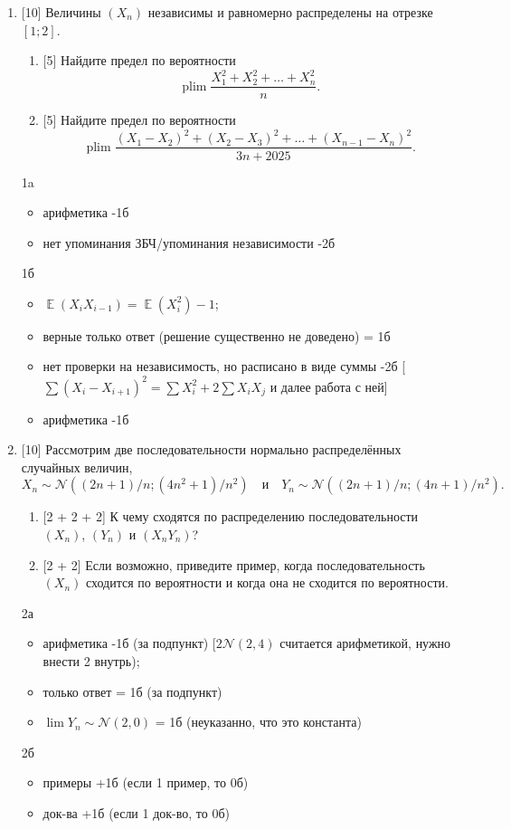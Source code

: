 \documentclass[12pt]{article}
\DeclareMathOperator{\E}{\mathbb{E}}
\DeclareMathOperator{\plim}{plim}
\newcommand{\cN}{\mathcal{N}}
\begin{document}
\begin{enumerate}
\item {[10]} Величины $(X_n)$ независимы и равномерно распределены на отрезке $[1; 2]$.
\begin{enumerate}
\item {[5]} Найдите предел по вероятности
\[
\plim \frac{X_1^2 + X_2^2 + \dots + X_n^2}{n}.
\]
\item {[5]} Найдите предел по вероятности 
\[
    \plim \frac{(X_1 - X_2)^2 + (X_2 - X_3)^2 + \dots + (X_{n-1} - X_n)^2}{3n + 2025}.
\]
\end{enumerate}



1a
\begin{itemize}
    \item арифметика -1б
    \item нет упоминания ЗБЧ/упоминания независимости -2б
\end{itemize}
1б 
\begin{itemize}
    \item $\E(X_i X_{i-1}) = \E(X_i^2) -1$;
    \item верные только ответ (решение существенно не доведено) = 1б
    \item нет проверки на независимость, но расписано в виде суммы -2б [$\sum (X_i - X_{i+1})^2 = \sum X_i^2 + 2 \sum X_i X_j$ и далее работа с ней]
    \item арифметика -1б
\end{itemize}


\item {[10]} Рассмотрим две последовательности нормально распределённых случайных величин, 
\[
X_n \sim \cN((2n+1)/n; (4n^2 + 1) / n^2) \quad \text{и} \quad Y_n \sim \cN((2n + 1)/n; (4n + 1) / n^2).
\]
\begin{enumerate}
    \item {[2 + 2 + 2]} К чему сходятся по распределению последовательности $(X_n)$, $(Y_n)$ и $(X_n Y_n)$?
    \item {[2 + 2]} Если возможно, приведите пример, когда последовательность $(X_n)$ сходится по вероятности и когда она не сходится по вероятности.
\end{enumerate}

2а
\begin{itemize}
    \item арифметика -1б (за подпункт) [$2 \cN(2,4)$ считается арифметикой, нужно внести 2 внутрь);
    \item только ответ = 1б (за подпункт)
    \item $\lim Y_n \sim \cN(2,0)$ = 1б (неуказанно, что это константа)
\end{itemize}
2б
\begin{itemize}
    \item примеры +1б (если 1 пример, то 0б)
    \item док-ва +1б (если 1 док-во, то 0б)
\end{itemize}



\end{enumerate}
\end{document}
